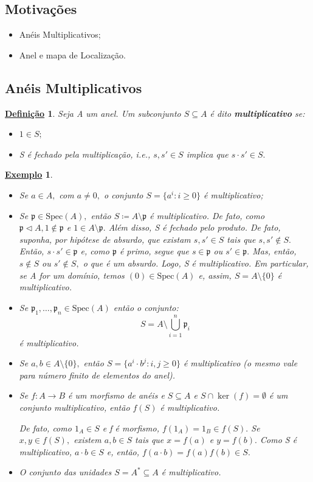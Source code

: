 \documentclass{article}
\newtheorem*{def*}{\underline{Defini\c c\~ao}}
\newtheorem{example}{\underline{Exemplo}}
\begin{document}
\subsection{Motivações}
\begin{itemize}
  \item Anéis Multiplicativos;
  \item Anel e mapa de Localização.
\end{itemize}
\subsection{Anéis Multiplicativos}
\begin{def*}
  Seja A um anel. Um subconjunto \(S\subseteq A\) é dito \textbf{multiplicativo} se:
  \begin{itemize}
    \item[1)] \(1\in S;\)
    \item[2)] S é fechado pela multiplicação, i.e., \(s, s'\in S\) implica que \(s \cdot s'\in S.\)
  \end{itemize}
\end{def*}
\begin{example}
  \begin{itemize}
    \item[1)] Se \(a\in A,\) com \(a\neq 0,\) o conjunto \(S = \{a^{i}: i\geq 0\}\) é multiplicativo;
    \item[2)] Se \(\mathfrak{p}\in \mathrm{Spec}(A),\) então \(S\coloneqq A\setminus{\mathfrak{p}}\) é multiplicativo. De fato, como
      \(\mathfrak{p}\vartriangleleft A, 1\not\in \mathfrak{p}\) e \(1\in A\setminus{\mathfrak{p}}.\)
      Além disso, S é fechado pelo produto. De fato, suponha, por hipótese de absurdo, que existam \(s, s'\in S\) tais que \(s, s'\not\in S.\) Então,
      \(s \cdot s'\in \mathfrak{p}\) e, como \(\mathfrak{p}\) é primo, segue que \(s\in \mathfrak{p}\) ou \(s'\in \mathfrak{p}.\) Mas, então, \(s\not\in S\) ou
      \(s'\not\in S,\) o que é um absurdo. Logo, S é multiplicativo. Em particular, se A for um domínio, temos \((0)\in \mathrm{Spec}(A)\) e, assim,
      \(S=A\setminus{\{0\}}\) é multiplicativo.
    \item[3)] Se \(\mathfrak{p}_{1}, \dotsc , \mathfrak{p}_{n}\in \mathrm{Spec}(A)\) então o conjunto:
      \[
        S = A\setminus{\bigcup_{i=1}^{n}\mathfrak{p}_{i}}
      \]
      é multiplicativo.
    \item[4)] Se \(a, b\in A \setminus{\{0\}},\) então \(S = \{a^{i}\cdot b^{j}: i, j\geq 0\}\) é multiplicativo (o mesmo vale para número finito de
      elementos do anel).
    \item[5)] Se \(f:A\rightarrow B\) é um morfismo de anéis e \(S\subseteq A\) e \(S\cap \ker{(f)} = \emptyset\) é um conjunto multiplicativo,
      então \(f(S)\) é multiplicativo.

      De fato, como \(1_{A}\in S\) e f é morfismo, \(f(1_{A}) = 1_{B}\in f(S).\) Se \(x, y\in f(S),\) existem
      \(a, b\in S\) tais que \(x=f(a)\) e \(y=f(b).\) Como S é multiplicativo, \(a \cdot b\in S\) e, então, \(f(a \cdot b) = f(a)f(b)\in S.\) 
    \item[6)] O conjunto das unidades \(S = A^{*}\subseteq A\) é multiplicativo.
  \end{itemize}
\end{example}
\end{document}
